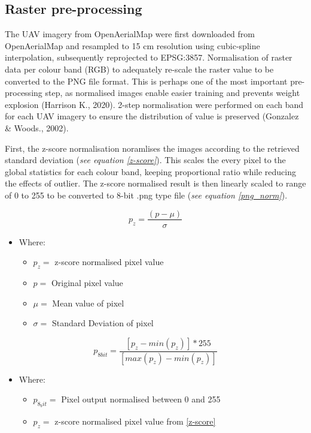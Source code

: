 \documentclass[11pt, a4paper, twoside]{report}
\begin{document}
\subsection{Raster pre-processing}

The UAV imagery from OpenAerialMap were first downloaded from OpenAerialMap and resampled to 15 cm resolution using cubic-spline interpolation, subsequently reprojected to EPSG:3857. Normalisation of raster data per colour band (RGB) to adequately re-scale the raster value to be converted to the PNG file format. This is perhaps one of the most important pre-processing step, as normalised images enable easier training and prevents weight explosion (Harrison K., 2020). 2-step normalisation were performed on each band for each UAV imagery to ensure the distribution of value is preserved (Gonzalez \& Woods., 2002).\\\par

First, the z-score normalisation noramlises the images according to the retrieved standard deviation (\textit{see equation \ref{z-score}}). This scales the every pixel to the global statistics for each colour band, keeping proportional ratio while reducing the effects of outlier. The z-score normalised result is then linearly scaled to range of 0 to 255 to be converted to 8-bit .png type file (\textit{see equation \ref{png_norm}}).

\begin{equation}
  \label{z-score}
  p_{z} = \frac{(p - \mu)}{\sigma}
\end{equation}

\begin{itemize}
  \item Where:
    \begin{itemize}
      \item $p_{z} =$ z-score normalised pixel value
      \item $p =$ Original pixel value
      \item $\mu =$ Mean value of pixel
      \item $\sigma =$ Standard Deviation of pixel
    \end{itemize}
\end{itemize}

\begin{equation}
  \label{png_norm}
  p_{8 bit} = \frac{[p_{z} - min(p_{z})] * 255}{[max(p_{z}) - min(p_{z})]}
\end{equation}

\begin{itemize}
  \item Where:
    \begin{itemize}
      \item $p_{8_bit} =$ Pixel output normalised between 0 and 255
      \item $p_{z} =$ z-score normalised pixel value from \ref{z-score}
    \end{itemize}
\end{itemize}
\end{document}
